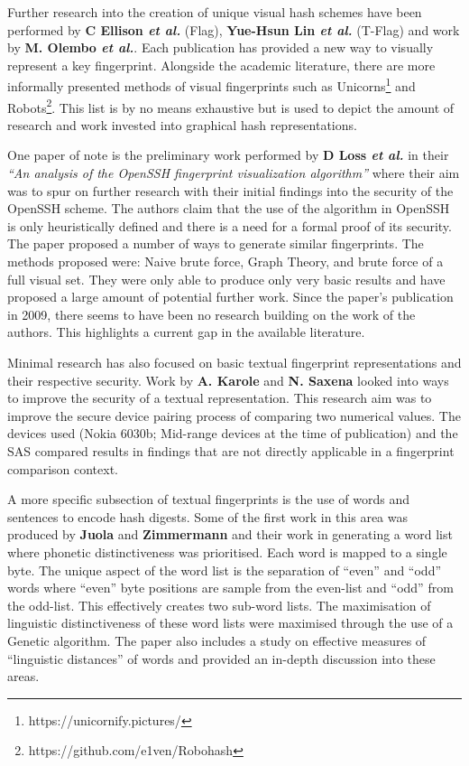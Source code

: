 Further research into the creation of unique visual hash schemes have been performed by \textbf{C Ellison \textit{et al.}} \cite{ellison2003public} (Flag), \textbf{Yue-Hsun Lin \textit{et al.}}\cite{lin2010spate} (T-Flag) and work by \textbf{M.  Olembo \textit{et al.}}\cite{olembo2013developing}. Each publication has provided a new way to visually represent a key fingerprint. Alongside the academic literature, there are more informally presented methods of visual fingerprints such as Unicorns\footnote{https://unicornify.pictures/} and Robots\footnote{https://github.com/e1ven/Robohash}. This list is by no means exhaustive but is used to depict the amount of research and work invested into graphical hash representations.

One paper of note is the preliminary work performed by \textbf{D Loss \textit{et al.}}\cite{loss2009drunken} in their \textit{``An analysis of the OpenSSH fingerprint visualization algorithm''} where their aim was to spur on further research with their initial findings into the security of the OpenSSH scheme. The authors claim that the use of the algorithm in OpenSSH is only heuristically defined and there is a need for a formal proof of its security. \\
The paper proposed a number of ways to generate similar fingerprints. The methods proposed were: Naive brute force, Graph Theory, and brute force of a full visual set. They were only able to produce only very basic results and have proposed a large amount of potential further work. Since the paper's publication in 2009, there seems to have been no research building on the work of the authors. This highlights a current gap in the available literature.

Minimal research has also focused on basic textual fingerprint representations and their respective security. Work by \textbf{A. Karole} and \textbf{N. Saxena}\cite{karole2009improving} looked into ways to improve the security of a textual representation. This research aim was to improve the secure device pairing process of comparing two numerical values. The devices used (Nokia 6030b; Mid-range devices at the time of publication) and the SAS compared results in findings that are not directly applicable in a fingerprint comparison context. 

A more specific subsection of textual fingerprints is the use of words and sentences to encode hash digests. Some of the first work in this area was produced by \textbf{Juola} and \textbf{Zimmermann}
\cite{juola1996whole} and their work in generating a word list where phonetic distinctiveness was prioritised. Each word is mapped to a single byte. The unique aspect of the word list is the separation of ``even'' and ``odd'' words where ``even'' byte positions are sample from the even-list and ``odd'' from the odd-list. This effectively creates two sub-word lists. The maximisation of linguistic distinctiveness of these word lists were maximised through the use of a Genetic algorithm. The paper also includes a study on effective measures of ``linguistic distances'' of words and provided an in-depth discussion into these areas.

